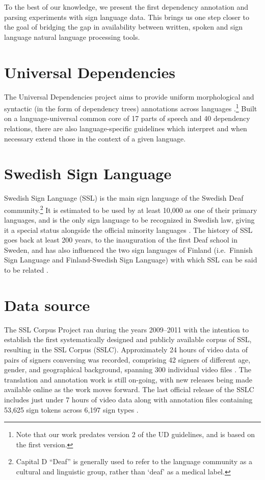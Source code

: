 \documentclass[11pt]{article}
\begin{document}
To the best of our knowledge, we present the first dependency annotation and
parsing experiments with sign language data. This brings us one step closer to
the goal of bridging the gap in availability between written, spoken and sign
language natural language processing tools.

\section{Universal Dependencies}

The Universal Dependencies project aims to provide uniform morphological and
syntactic (in the form of dependency trees) annotations across languages
\cite{Nivre2016ud}.\footnote{Note that our work predates version 2 of the UD
guidelines, and is based on the first version.}
Built on a language-universal common core of 17 parts of speech and
40 dependency relations, there are also language-specific guidelines which
interpret and when necessary extend those in the context of a given language.

\section{Swedish Sign Language}

Swedish Sign Language (SSL) is the main sign language of the Swedish Deaf
community.\footnote{Capital D ``Deaf'' is generally used to refer to the
language community as a cultural and linguistic group, rather than `deaf' as a
medical label.} It is estimated to be used by at least 10,000 as one of their
primary languages, and is the only sign language to be recognized in Swedish
law, giving it a special status alongside the official minority languages
\cite{Ahlgren2006sou,Parkvall2015siffror}. The history of SSL goes back at
least 200 years, to the inauguration of the first Deaf school in Sweden, and
has also influenced the two sign languages of Finland (i.e.~Finnish Sign
Language and Finland-Swedish Sign Language) with which SSL can be said to be
related \cite{Bergman2010transmission}.

\section{Data source}

The SSL Corpus Project ran during the years 2009--2011 with the intention to
establish the first systematically designed and publicly available corpus of
SSL, resulting in the SSL Corpus (SSLC). Approximately 24 hours of video data
of pairs of signers conversing was recorded, comprising 42 signers of
different age, gender, and geographical background, spanning 300 individual
video files \cite{Mesch2012signed}. The translation and annotation work is
still on-going, with new releases being made available online as the work
moves forward. The last official release of the SSLC includes just under 7
hours of video data \cite{Mesch2012dataset} along with annotation files
containing 53,625 sign tokens across 6,197 sign types
\cite{Mesch2016annotated}. 
\end{document}
